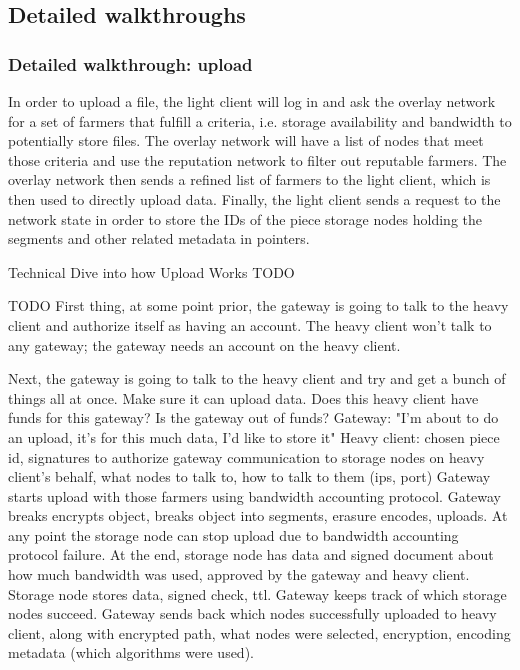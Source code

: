 \documentclass[a4paper,10pt]{article} \usepackage[utf8]{inputenc}
\newcommand{\todo}[1]{{\color{red} TODO #1 }}
\begin{document}
\subsection{Detailed walkthroughs}

\subsubsection{Detailed walkthrough: upload}

In order to upload a file, the light client will log in
and ask the overlay network for a set of farmers that fulfill a criteria, i.e.
storage availability and bandwidth to potentially store files. The overlay
network will have a list of nodes that meet those criteria and use the
reputation network to filter out reputable farmers. The overlay network then
sends a refined list of farmers to the light client, which is then used to
directly upload data. Finally, the light client sends a request to the network
state in order to store the IDs of the piece storage nodes holding the segments
and other related metadata in pointers.

Technical Dive into how Upload Works \todo{}

\todo{
First thing, at some point prior, the gateway is going to talk to the heavy
client and authorize itself as having an account. The heavy client won't talk
to any gateway; the gateway needs an account on the heavy client.

Next, the gateway is going to talk to the heavy client and try and get a bunch
of things all at once.
Make sure it can upload data. Does this heavy client have funds for this
gateway? Is the gateway out of funds?
Gateway: "I'm about to do an upload, it's for this much data, I'd like to
         store it"
Heavy client: chosen piece id, signatures to authorize gateway communication
   to storage nodes on heavy client's behalf, what nodes to talk to, how
   to talk to them (ips, port)
Gateway starts upload with those farmers using bandwidth accounting protocol.
Gateway breaks encrypts object, breaks object into segments, erasure encodes,
uploads.
At any point the storage node can stop upload due to bandwidth accounting
protocol failure.
At the end, storage node has data and signed document about how much
bandwidth was used, approved by the gateway and heavy client. Storage node
stores data, signed check, ttl.
Gateway keeps track of which storage nodes succeed.
Gateway sends back which nodes successfully uploaded to heavy client, along
with encrypted path, what nodes were selected, encryption, encoding metadata
(which algorithms were used).
}
\end{document}
